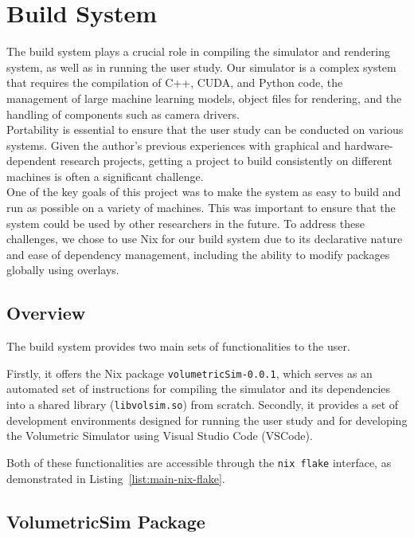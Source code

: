\section{Build System}

The build system plays a crucial role in compiling the simulator and rendering system, as well as in running the user study. Our simulator is a complex system that requires the compilation of C++, CUDA, and Python code, the management of large machine learning models, object files for rendering, and the handling of components such as camera drivers.\\

Portability is essential to ensure that the user study can be conducted on various systems. Given the author's previous experiences with graphical and hardware-dependent research projects, getting a project to build consistently on different machines is often a significant challenge.\\

One of the key goals of this project was to make the system as easy to build and run as possible on a variety of machines. This was important to ensure that the system could be used by other researchers in the future. To address these challenges, we chose to use Nix for our build system due to its declarative nature and ease of dependency management, including the ability to modify packages globally using overlays.

\subsection{Overview}

The build system provides two main sets of functionalities to the user. 

Firstly, it offers the Nix package \texttt{volumetricSim-0.0.1}, which serves as an automated set of instructions for compiling the simulator and its dependencies into a shared library (\texttt{libvolsim.so}) from scratch. Secondly, it provides a set of development environments designed for running the user study and for developing the Volumetric Simulator using Visual Studio Code (VSCode).

Both of these functionalities are accessible through the \texttt{nix flake} interface, as demonstrated in Listing~\ref{list:main-nix-flake}.


\subsection{VolumetricSim Package}


